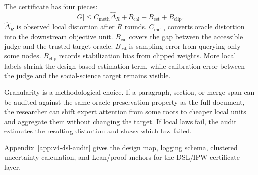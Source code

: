 The certificate has four pieces:
\[
  |G|
  \le
  C_{\mathrm{meth}}\hat{\Delta}_R
  + B_{\mathrm{cal}} + B_{\mathrm{est}} + B_{\mathrm{clip}}.
\]
$\hat{\Delta}_R$ is observed local distortion after $R$ rounds.
$C_{\mathrm{meth}}$ converts oracle distortion into the downstream objective
unit. $B_{\mathrm{cal}}$ covers the gap between the accessible judge and the
trusted target oracle. $B_{\mathrm{est}}$ is sampling error from querying only
some nodes. $B_{\mathrm{clip}}$ records stabilization bias from clipped
weights. More local labels shrink the design-based estimation term, while
calibration error between the judge and the social-science target remains
visible.

Granularity is a methodological choice. If a paragraph, section, or merge span
can be audited against the same oracle-preservation property as the full
document, the researcher can shift expert attention from some roots to cheaper
local units and aggregate them without changing the target. If local laws fail,
the audit estimates the resulting distortion and shows which law failed.

Appendix~\ref{app:v4-dsl-audit} gives the design map, logging schema,
clustered uncertainty calculation, and Lean/proof anchors for the
DSL/IPW certificate layer.
